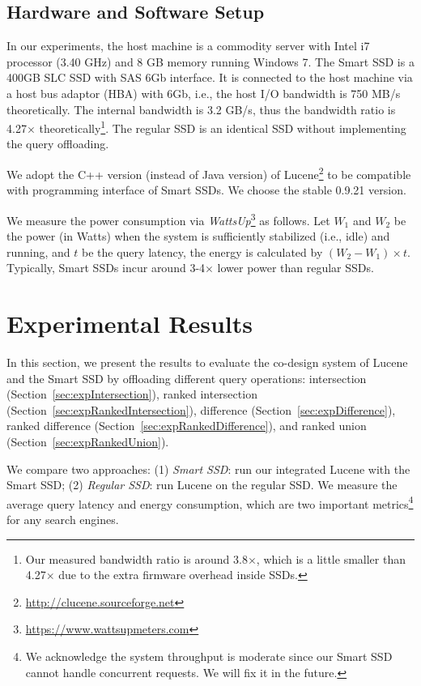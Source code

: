\subsection{Hardware and Software Setup}\label{sec:hwswsetup}
In our experiments, the host machine is a commodity server with Intel i7 processor (3.40 GHz) and 8 GB memory running Windows 7.
The Smart SSD is a 400GB SLC SSD with SAS 6Gb interface. It is connected to the host machine via a host bus adaptor (HBA) with 6Gb, i.e., the host I/O bandwidth is 750 MB/s theoretically. The internal bandwidth is 3.2 GB/s, thus the bandwidth ratio is 4.27$\times$ theoretically\footnote{\small Our measured bandwidth ratio is around 3.8$\times$, which is a little smaller than 4.27$\times$ due to the extra firmware overhead inside SSDs.}. The regular SSD is an identical SSD without implementing the query offloading.

We adopt the C++ version (instead of Java version) of Lucene\footnote{\small\url{http://clucene.sourceforge.net}} to be compatible with programming interface of Smart SSDs. We choose the stable 0.9.21 version.

We measure the power consumption via \emph{WattsUp}\footnote{\small \url{https://www.wattsupmeters.com}} as follows. Let $W_1$ and $W_2$ be the power (in Watts) when the system is sufficiently stabilized (i.e., idle) and running, and $t$ be the query latency, the energy is calculated by $(W_2-W_1)\times t$. Typically, Smart SSDs incur around 3-4$\times$ lower power than regular SSDs.


\section{Experimental Results}\label{sec:expResults}
In this section, we present the results to evaluate the co-design system of Lucene and the Smart SSD by offloading different query operations: \textsf{intersection} (Section~\ref{sec:expIntersection}), \textsf{ranked intersection} (Section~\ref{sec:expRankedIntersection}),
\textsf{difference} (Section~\ref{sec:expDifference}), \textsf{ranked difference} (Section~\ref{sec:expRankedDifference}), and \textsf{ranked union} (Section~\ref{sec:expRankedUnion}).

We compare two approaches: (1) \emph{Smart SSD}: run our integrated Lucene with the Smart SSD; (2) \emph{Regular SSD}: run Lucene on the regular SSD. We measure the average query latency and energy consumption, which are two important metrics\footnote{\small We acknowledge the system throughput is moderate since our Smart SSD cannot handle concurrent requests. We will fix it in the future.} for any search engines.


